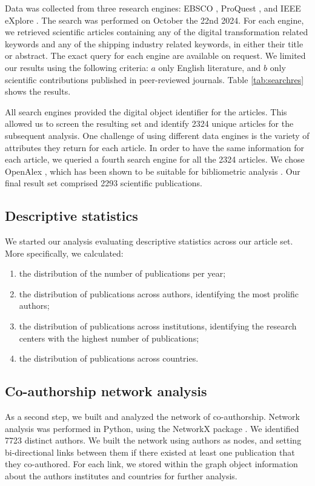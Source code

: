\documentclass[jmse,review,submit,pdftex,moreauthors]{Definitions/mdpi}
\begin{document}
Data was collected from three research engines: EBSCO \citep{vaughan2011ebsco}, ProQuest \citep{cooke2017proquest}, and IEEE eXplore \citep{wilde2016ieee}. The search was performed on October the 22nd 2024. For each engine, we retrieved scientific articles containing any of the digital transformation related keywords and any of the shipping industry related keywords, in either their title or abstract. The exact query for each engine are available on request. We limited our results using the following criteria: \(a\) only English literature, and \(b\) only scientific contributions published in peer-reviewed journals. Table \ref{tab:searchres} shows the results.

All search engines provided the digital object identifier for the articles. This allowed us to screen the resulting set and identify 2324 unique articles for the subsequent analysis. One challenge of using different data engines is the variety of attributes they return for each article. In order to have the same information for each article, we queried a fourth search engine for all the 2324 articles. We chose OpenAlex \citep{priem2022openalex}, which has been shown to be suitable for bibliometric analysis \citep{alperin2024analysis}. Our final result set comprised 2293 scientific publications.

\subsection{Descriptive statistics}
We started our analysis evaluating descriptive statistics across our article set. More specifically, we calculated:
\begin{enumerate}
	\item the distribution of the number of publications per year;
	\item the distribution of publications across authors, identifying the most prolific authors;
	\item the distribution of publications across institutions, identifying the research centers with the highest number of publications;
	\item the distribution of publications across countries.
\end{enumerate}

\subsection{Co-authorship network analysis}
As a second step, we built and analyzed the network of co-authorship. Network analysis was performed in Python, using the NetworkX package \citep{hagberg2008exploring}. We identified 7723 distinct authors. We built the network using authors as nodes, and setting bi-directional links between them if there existed at least one publication that they co-authored. For each link, we stored within the graph object information about the authors institutes and countries for further analysis.
\end{document}
